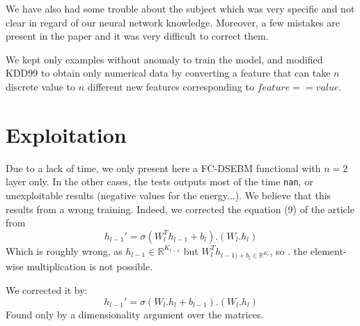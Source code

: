 \documentclass[a4paper]{article}
\begin{document}
We have also had some trouble about the subject which was very specific and not clear in regard of our neural network knowledge. Moreover, a few mistakes are present in the paper and it was very difficult to correct them.

We kept only examples without anomaly to train the model, and modified KDD99 to obtain only numerical data by converting a feature that can take $n$ discrete value to $n$ different new features corresponding to $feature == value$.


\section{Exploitation}
Due to a lack of time, we only present here a FC-DSEBM functional with $n=2$ layer only. In the other cases, the tests outputs most of the time \texttt{nan}, or unexploitable results (negative values for the energy...). We believe that this results from a wrong training. Indeed, we corrected the equation  (9) of the article from 
\[h_{l-1}' = \sigma (W_l^T h_{l-1} + b_l) . ( W_l.h_l)\]
Which is roughly wrong, as $h_{l-1} \in \mathbb{R}^{K_{l-1}}$ but $W_l^T h_{l-1) + b_l \in \mathbb{R}^{K_{l}}}$, so $.$ the element-wise multiplication is not possible.

We corrected it by:
\[h_{l-1}' = \sigma (W_{l}. h_{l} + b_{l-1}) . ( W_l.h_l)\]
Found only by a dimensionality argument over the matrices.




\newpage



\end{document}
